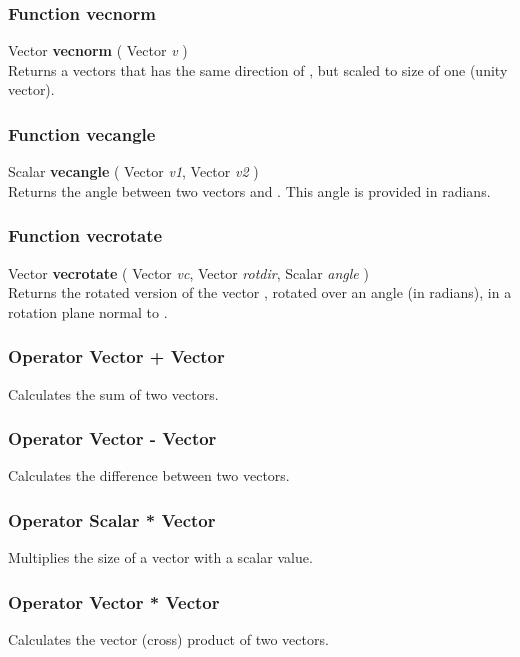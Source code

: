 \subsubsection{Function vecnorm \label{F:vecnorm}}
Vector \textbf{vecnorm} ( Vector \textit{v} ) \\
Returns a vectors that has the same direction of , but scaled to size of one (unity vector).

\subsubsection{Function vecangle \label{F:vecangle}}
Scalar \textbf{vecangle} ( Vector \textit{v1}, Vector \textit{v2} ) \\
Returns the angle between two vectors  and . This angle is provided in radians.

\subsubsection{Function vecrotate \label{F:vecrotate}}
Vector \textbf{vecrotate} ( Vector \textit{vc}, Vector \textit{rotdir}, Scalar \textit{angle} ) \\
Returns the rotated version of the vector , rotated over an angle  (in radians), in a rotation plane normal to .

\subsubsection{Operator Vector + Vector \label{O:Vector+Vector}}
Calculates the sum of two vectors.

\subsubsection{Operator Vector - Vector \label{O:Vector-Vector}}
Calculates the difference between two vectors.

\subsubsection{Operator Scalar * Vector \label{O:Scalar*Vector}}
Multiplies the size of a vector with a scalar value.

\subsubsection{Operator Vector * Vector \label{O:Vector*Vector}}
Calculates the vector (cross) product of two vectors.

